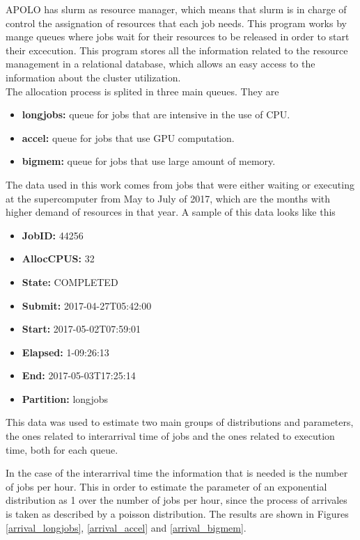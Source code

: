 \documentclass{wscpaperproc}
\begin{document}
APOLO has slurm \cite{slurm} as resource manager, which means that slurm is in
charge of control the assignation of resources that each job needs. This program
works by mange queues where jobs wait for their resources to be released in
order to start their excecution. This program stores all the information related
to the resource management in a relational database, which allows an easy
access to the information about the cluster utilization.\\

The allocation process is splited in three main queues. They are
\begin{itemize}
    \item \textbf{longjobs:} queue for jobs that are intensive in the use of CPU.
    \item \textbf{accel:} queue for jobs that use GPU computation.
    \item \textbf{bigmem:} queue for jobs that use large amount of memory.
\end{itemize}

The data used in this work comes from jobs that were either waiting or executing
at the supercomputer from May to July of 2017, which are the months with higher
demand of resources in that year. A sample of this data looks like
this

\begin{itemize}
    \item \textbf{JobID:} 44256
    \item \textbf{AllocCPUS:} 32
    \item \textbf{State:} COMPLETED
    \item \textbf{Submit:} 2017-04-27T05:42:00
    \item \textbf{Start:} 2017-05-02T07:59:01
    \item \textbf{Elapsed:} 1-09:26:13
    \item \textbf{End:} 2017-05-03T17:25:14
    \item \textbf{Partition:} longjobs
\end{itemize}

This data was used to estimate two main groups of distributions and parameters,
the ones related to interarrival time of jobs and the ones related to execution
time, both for each queue.

In the case of the interarrival time the information that is needed is the
number of jobs per hour. This in order to estimate the parameter of an
exponential distribution as 1 over the number of jobs per hour, since the
process of arrivales is taken as described by a poisson distribution.
The results are shown in Figures \ref{arrival_longjobs}, \ref{arrival_accel} and
\ref{arrival_bigmem}.
\end{document}
